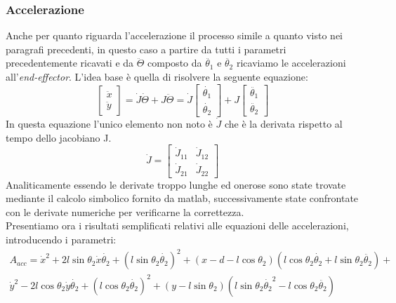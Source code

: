 \subsubsection{Accelerazione}
Anche per quanto riguarda l'accelerazione il processo  simile a quanto visto nei paragrafi precedenti, in questo caso a partire da tutti i parametri precedentemente ricavati e da $\ddot{\Theta}$ composto da $\ddot{\theta_1}$ e $\ddot{\theta_2}$ ricaviamo le accelerazioni all'\textit{end-effector}. L'idea base è quella di risolvere la seguente equazione:
\begin{equation}
	\begin{bmatrix}
		\ddot{x} \\ \ddot{y}
	\end{bmatrix} = \dot{J}\dot{\Theta} + J\ddot{\Theta} = \dot{J}\begin{bmatrix}
	\dot{\theta_1} \\ \dot{\theta_2}
\end{bmatrix} + J \begin{bmatrix}
\ddot{\theta_1} \\ \ddot{\theta_2}
\end{bmatrix}
\end{equation}
In questa equazione l'unico elemento non noto è $\dot{J}$ che è la derivata rispetto al tempo dello jacobiano J.
\begin{equation*}
	\dot{J} = \begin{bmatrix}
		\dot{J}_{11} & \dot{J}_{12} \\
	\dot{J}_{21} & \dot{J}_{22}
	\end{bmatrix}
\end{equation*}
Analiticamente essendo le derivate troppo lunghe ed onerose sono state trovate mediante il calcolo simbolico fornito da matlab, successivamente state confrontate con le derivate numeriche per verificarne la correttezza. 
\\Presentiamo ora i risultati semplificati relativi alle equazioni delle accelerazioni, introducendo i parametri:
\begin{equation*}
\begin{aligned}
    A_{acc} = \dot{x}^2 + 2l\sin\theta_2\dot{x}\dot{\theta_2}+(l\sin\theta_2\dot{\theta_2})^2 + (x-d-l\cos\theta_2)(l\cos\theta_2\dot{\theta_2}+l\sin\theta_2\ddot{\theta_2}) +\\ \dot{y}^2-2l\cos\theta_2\dot{y}\dot{\theta_2}+(l\cos\theta_2\dot{\theta_2})^2+(y-l\sin\theta_2)(l\sin\theta_2\dot{\theta_2}^2-l\cos\theta_2\ddot{\theta_2})
    \end{aligned}
\end{equation*}
